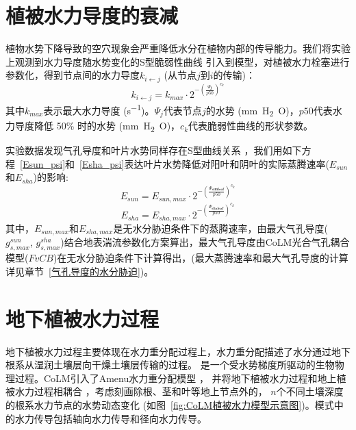 \section{植被水力导度的衰减}\label{植被水力导度的衰减}
植物水势下降导致的空穴现象会严重降低水分在植物内部的传导能力。我们将实验上观测到水力导度随水势变化的S型脆弱性曲线 
\citep{sperry1988method,gentine2016allometry,neufeld1992genotypic,pammenter1998mathematical,plaut2012hydraulic}
 引入到模型，对植被水力栓塞进行参数化，得到节点间的水力导度$k_{i\gets j}$ (从节点$j$到$i$的传输)：
\begin{equation}
k_{i \leftarrow j}=k_{max} \cdot 2^{-\left(\frac{\Psi_{\mathbf{j}}}{p 50}\right)^{c_{k}}}
\end{equation}
其中$k_{max}$表示最大水力导度 (\unit{s^{-1}})。$\Psi_j$代表节点$j$的水势 (\unit{mm.H_2O})，$p50$代表水力导度降低 50\% 时的水势 (\unit{mm.H_2O})，$c_k$代表脆弱性曲线的形状参数。


实验数据发现气孔导度和叶片水势同样存在S型曲线关系 \citep{kennedy2019implementing,klein2014variability}，我们用如下方程~\eqref{Esun_psi}和~\eqref{Esha_psi}表达叶片水势降低对阳叶和阴叶的实际蒸腾速率($E_{sun}$和$E_{sha}$)的影响:
\begin{equation}\label{Esun_psi}
E_{sun}=E_{sun,max} \cdot 2^{-\left(\frac{\Psi_{\mathbf{sunleaf}}}{p 50}\right)^{c_{k}}}
\end{equation}
\begin{equation}\label{Esha_psi}
E_{sha}=E_{sha,max} \cdot 2^{-\left(\frac{\Psi_{\mathbf{shaleaf}}}{p 50}\right)^{c_{k}}}
\end{equation}
其中，$E_{sun,max}$和$E_{sha,max}$是无水分胁迫条件下的蒸腾速率，由最大气孔导度($g_{s,max}^{sun}$, $g_{s,max}^{sha}$)结合地表湍流参数化方案算出，最大气孔导度由CoLM光合气孔耦合模型($FvCB$)在无水分胁迫条件下计算得出，(最大蒸腾速率和最大气孔导度的计算详见章节~\ref{气孔导度的水分胁迫})。


\section{地下植被水力过程}\label{地下植被水力过程}
地下植被水力过程主要体现在水力重分配过程上，水力重分配描述了水分通过地下根系从湿润土壤层向干燥土壤层传输的过程。
是一个受水势梯度所驱动的生物物理过程。CoLM引入了Amenu水力重分配模型\citep{amenu2008} \citep{zhu2017incorporating}，
并将地下植被水力过程和地上植被水力过程相耦合 \citep{li2021new}，考虑刻画除根、茎和叶等地上节点外的， 
$n$个不同土壤深度的根系水力节点的水势动态变化 (如图~\ref{fig:CoLM植被水力模型示意图})。模式中的水力传导包括轴向水力传导和径向水力传导。

